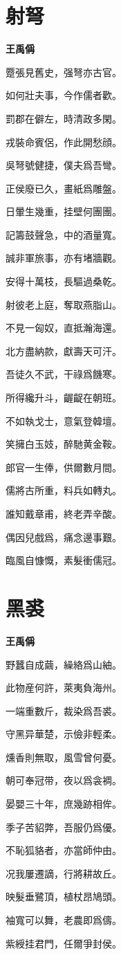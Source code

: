 \documentclass[12pt,a4paper]{ctexbook}
\begin{document}
\section{射弩}
\textbf{王禹偁}\par\vspace{0.5em}
蹷張見舊史，强弩亦古官。\par
如何壯夫事，今作儒者歡。\par
罰郡在僻左，時清政多閑。\par
戎裝命賓侶，作此開愁顔。\par
吳弩號健捷，僕夫爲吾彎。\par
正侯廢已久，畫紙爲雕盤。\par
日暈生幾重，挂壁何團團。\par
記籌鼓聲急，中的酒量寬。\par
誠非軍旅事，亦有堵牆觀。\par
安得十萬枝，長驅過桑乾。\par
射彼老上庭，奪取燕脂山。\par
不見一匈奴，直抵瀚海還。\par
北方盡納款，獻壽天可汗。\par
吾徒久不武，干祿爲饑寒。\par
所得纔升斗，齷齪在朝班。\par
不如執戈士，意氣登韓壇。\par
笑擁白玉妓，醉馳黄金鞍。\par
郎官一生俸，供爾數月間。\par
儒將古所重，料兵如轉丸。\par
誰知戴章甫，終老弄辛酸。\par
偶因兒戲爲，痛念邊事艱。\par
臨風自慷慨，素髮衝儒冠。\par

\section{黑裘}
\textbf{王禹偁}\par\vspace{0.5em}
野蠶自成繭，繰絡爲山紬。\par
此物産何許，萊夷負海州。\par
一端重數斤，裁染爲吾裘。\par
守黑异華楚，示儉非輕柔。\par
燻香則無取，風雪曾何憂。\par
朝可奉冠带，夜以爲衾裯。\par
晏嬰三十年，庶幾跡相侔。\par
季子苦貂弊，吾服仍爲優。\par
不恥狐貉者，亦當師仲由。\par
况我屢遷謫，行將耕故丘。\par
映髮垂鷺頂，植杖昂鳩頭。\par
袖寬可以舞，老農即爲儔。\par
紫綬挂君門，任爾爭封侯。\par
\end{document}
